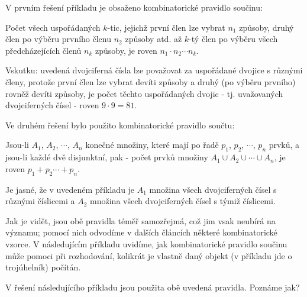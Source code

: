     

    V prvním řešení příkladu je obsaženo kombinatorické pravidlo součinu:
    
    \begin{mdframed}[style=highlight] Počet všech uspořádaných \(k\)-tic, jejichž první člen lze
      vybrat \(n_1\) způsoby, druhý člen po výběru prvního členu \(n_2\) způsoby atd. až \(k\)-tý
      člen po výběru všech předcházejících členů \(n_k\) způsoby, je roven \(n_1\cdot n_2\cdots
      n_k\).
    \end{mdframed}

    Vskutku: uvedená dvojciferná čísla lze považovat za uspořádané dvojice s různými členy, protože
    první člen lze vybrat devíti způsoby a druhý (po výběru prvního) rovněž devíti způsoby, je počet
    těchto uspořádaných dvojic - tj. uvažovaných dvojciferných čísel - roven \(9\cdot9= 81\).

    Ve druhém řešení bylo použito kombinatorické pravidlo součtu:
    
    \begin{mdframed}[style=highlight] Jsou-li \(A_1\), \(A_2\), \(\cdots\), \(A_n\) konečné množiny,
      které mají po řadě \(p_1\), \(p_2\), \(\cdots\), \(p_n\) prvků, a jsou-li každé dvě
      disjunktní, pak - počet prvků množiny \(A_1 \cup A_2 \cup\cdots\cup A_n\), je roven \(p_1 +
      p_2 \cdots + p_n\).        
    \end{mdframed}

    Je jasné, že v uvedeném příkladu je \(A_1\) množina všech dvojciferných čísel s různými
    číslicemi a \(A_2\) množina všech dvojciferných čísel s týmiž číslicemi. 
    
    Jak je vidět, jsou obě pravidla téměř samozřejmá, což jim vsak neubírá na významu; pomocí nich
    odvodíme v dalších článcích některé kombinatorické vzorce. V následujícím příkladu uvidíme, jak
    kombinatorické pravidlo součinu může pomoci při rozhodování, kolikrát je vlastně daný objekt (v
    příkladu jde o trojúhelník) počítán.
  
    

    V řešení následujícího  příkladu jsou použita obě uvedená pravidla. Poznáme jak?
    
